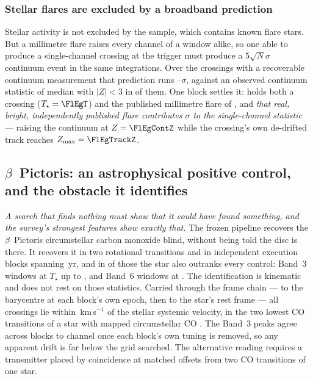 \subsubsection{Stellar flares are excluded by a broadband prediction}

Stellar activity is not excluded by the sample, which contains known flare
stars. But a millimetre flare raises every channel of a
window alike, so one able to produce a single-channel crossing at the trigger
must produce a $5\sqrt{N}\sigma$ continuum event in the same integrations.
Over the \FlNCont{} crossings with a recoverable continuum measurement that
prediction runs \FlPredLo--\FlPredHi$\sigma$, against an observed continuum
statistic of median \FlObsMed{} with $|Z|<3$ in \FlNQuiet{} of them. One
block settles it: \FlEgStar{} \texttt{\FlEgEb} holds both a crossing
($T_\star=\FlEgT$) and the published millimetre flare of
\citet{MacGregor2020}, and \emph{that real, bright, independently published
flare contributes \FlEgContrib$\sigma$ to the single-channel statistic} ---
raising the continuum at $Z=\FlEgContZ$ while the crossing's own de-drifted
track reaches $Z_{\max}=\FlEgTrackZ$.

\subsection{$\beta$~Pictoris: an astrophysical positive control, and the
obstacle it identifies} \label{sec:bpicval}

\emph{A search that finds nothing must show that it could have found
something, and the survey's strongest features show exactly that.} The
frozen pipeline recovers the $\beta$~Pictoris circumstellar carbon monoxide
blind, without being told the disc is there. It recovers it in two
rotational transitions and in \CsBpCoBlocks{} independent execution
blocks spanning \BpBaselineYr\,yr, and in \NStageOneBpicEb{} of those the
star also outranks every control: \BpicNFlagThree{} Band~3 windows at
$T_\star$ up to \BpicBThreeTsym, and \BpicNFlagSix{} Band~6 windows at
\BpicBSixTsym. The identification is kinematic and does not rest on those
statistics. Carried through the frame chain --- to the barycentre at each
block's own epoch, then to the star's rest frame --- all \BpicPanelNCo{}
crossings lie within \BpicDvCoHi\,km\,s$^{-1}$ of the stellar systemic
velocity, in the two lowest CO transitions of a star with mapped
circumstellar CO \citep{Dent2014,Matra2017}. The Band~3 peaks agree across blocks to
\BpRecThreeTuneChanMax{} channel once each block's own tuning is removed, so
any apparent drift is far below the grid searched. The alternative reading
requires a transmitter placed by coincidence at matched offsets from two CO
transitions of one star.

